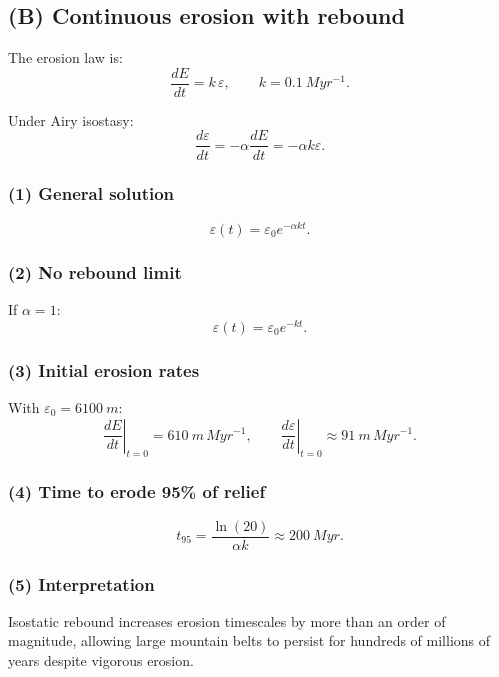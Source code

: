 \documentclass[11pt,a4paper]{article}
\begin{document}
\subsection*{(B) Continuous erosion with rebound}

The erosion law is:
\[
\frac{dE}{dt} = k\,\varepsilon,
\qquad k = \SI{0.1}{Myr^{-1}}.
\]

Under Airy isostasy:
\[
\frac{d\varepsilon}{dt} = -\alpha \frac{dE}{dt}
= -\alpha k \varepsilon.
\]

\subsubsection*{(1) General solution}

\[
\varepsilon(t) = \varepsilon_0 e^{-\alpha k t}.
\]

\subsubsection*{(2) No rebound limit}

If $\alpha=1$:
\[
\varepsilon(t) = \varepsilon_0 e^{-k t}.
\]

\subsubsection*{(3) Initial erosion rates}

With $\varepsilon_0 = \SI{6100}{m}$:
\[
\left.\frac{dE}{dt}\right|_{t=0} = 610~\si{m\,Myr^{-1}}, \qquad
\left.\frac{d\varepsilon}{dt}\right|_{t=0} \approx 91~\si{m\,Myr^{-1}}.
\]

\subsubsection*{(4) Time to erode 95\% of relief}

\[
t_{95} = \frac{\ln(20)}{\alpha k}
\approx \SI{200}{Myr}.
\]

\subsubsection*{(5) Interpretation}

Isostatic rebound increases erosion timescales by more than an order of magnitude,
allowing large mountain belts to persist for hundreds of millions of years despite
vigorous erosion.
\end{document}
